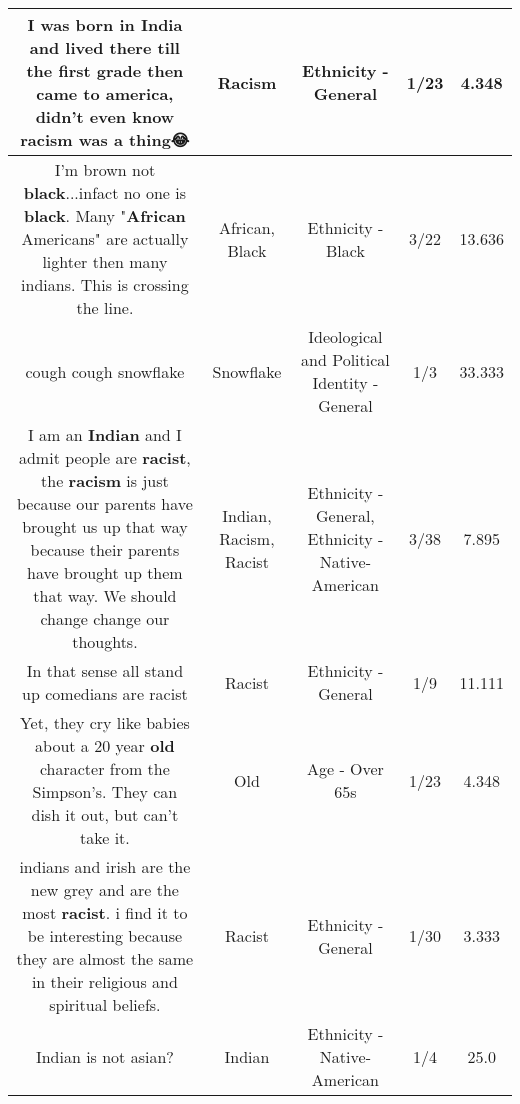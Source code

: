 \documentclass[11pt]{article}
\newlength\mylength
\begin{document}
\begin{center}
\begin{longtable}{|C{.65\mylength}|C{.30\mylength}|C{.12\mylength}|C{.12\mylength}|C{.12\mylength}|}
  \small I was born in India and lived there till the first grade then came to america, didn't even know \textbf{racism} was a thing😂\normalsize   & Racism & Ethnicity - General & 1/23 & 4.348 \\  \hline
  \small I'm brown not \textbf{black}...infact no one is \textbf{black}. Many "\textbf{African} Americans"  are actually lighter then many indians. This is crossing the line.\normalsize   & African, Black & Ethnicity - Black & 3/22 & 13.636 \\  \hline
  \small cough cough  snowflake\normalsize   & Snowflake &  Ideological and Political Identity - General & 1/3 & 33.333 \\  \hline
  \small I am an \textbf{Indian} and I admit people are \textbf{racist}, the \textbf{racism} is just because our parents have brought us up that way because their parents have brought up them that way. We should change change our thoughts.\normalsize   & Indian, Racism, Racist & Ethnicity - General, Ethnicity - Native-American & 3/38 & 7.895 \\  \hline
  \small In that sense all stand up comedians are racist\normalsize   & Racist & Ethnicity - General & 1/9 & 11.111 \\  \hline
  \small Yet, they cry like babies about a 20 year \textbf{old} character from the Simpson's. They can dish it out, but can't take it.\normalsize   & Old & Age - Over 65s & 1/23 & 4.348 \\  \hline
  \small indians and irish are the new grey and are the most \textbf{racist}.   i find it to be interesting because they are almost the same in their religious and spiritual beliefs.\normalsize   & Racist & Ethnicity - General & 1/30 & 3.333 \\  \hline
  \small Indian is not asian?\normalsize   & Indian & Ethnicity - Native-American & 1/4 & 25.0 \\  \hline

\end{longtable}
\end{center}
\end{document}
